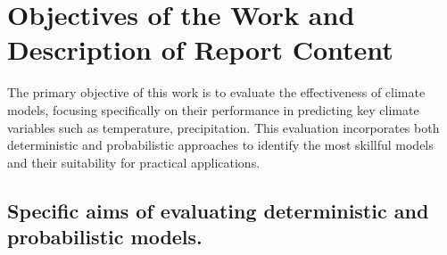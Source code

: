 \section{Objectives of the Work and Description of Report Content}
The primary objective of this work is to evaluate the effectiveness of climate models, focusing specifically on their performance in predicting key climate variables such as temperature, precipitation. This evaluation incorporates both deterministic and probabilistic approaches to identify the most skillful models and their suitability for practical applications.

\subsection{Specific aims  of evaluating deterministic and probabilistic models.
}
